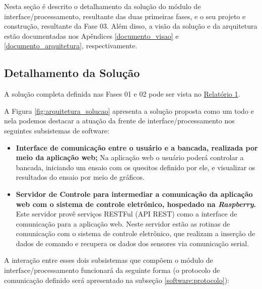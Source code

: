 \label{desenvolvimento_processamento}

Nesta seção é descrito o detalhamento da solução do módulo de interface/processamento, resultante das duas primeiras fases,
e o seu projeto e construção, resultante da Fase 03.
Além disso, a visão da solução e da arquitetura estão documentadas nos Apêndices \ref{documento_visao} e \ref{documento_arquitetura}, respectivamente.

\subsection{Detalhamento da Solução} \label{software:detalhamento_solucao}

A solução completa definida nas Fases 01 e 02 pode ser vista no \href{https://drive.google.com/file/d/0B5InkGKx6O-MR1B3eVYzZFpjQ3c/view?usp=sharing}{Relatório 1}.

A Figura \ref{fig:arquitetura_solucao} apresenta a solução proposta como um todo e nela podemos destacar a atuação da
frente de interface/processamento nos seguintes subsistemas de software:

\begin{itemize}
 \item \textbf{Interface de comunicação entre o usuário e a bancada, realizada por meio da aplicação web;}
      \subitem Na aplicação web o usuário poderá controlar a bancada, iniciando um ensaio com os quesitos definido por ele,
	       e visualizar os resultados do ensaio por meio de gráficos.
 \item \textbf{Servidor de Controle para intermediar a comunicação da aplicação web com o sistema de controle eletrônico, hospedado na \textit{Raspberry}.}
      \subitem Este servidor provê serviços RESTFul (API REST) como a interface de comunicação para a aplicação web. Neste servidor estão as 
	       rotinas de comunicação com o sistema de controle eletrônico, que realizam a inserção de dados de comando e recupera os dados 
	       dos sensores via comunicação serial.
\end{itemize}

A interação entre esses dois subsistemas que compõem o módulo de interface/processamento funcionará da seguinte forma
(o protocolo de comunicação definido será apresentado na subseção \ref{software:protocolo}):

